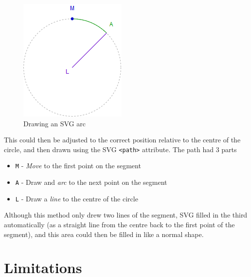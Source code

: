 \documentclass[ %
                    author={Aleena Baig},
                supervisor={Dr Simon Lock},
                    degree={BSc},
                     title={On Making Web Accessible Graphs},
                  subtitle={},
                      year={2019} ]{dissertation}
\begin{document}
\begin{figure}
\includegraphics[width=0.8\linewidth]{images/DrawingArc.png} 
\caption{Drawing an SVG arc}
\end{figure}

This could then be adjusted to the correct position relative to the centre of the circle, and then drawn using the SVG \texttt{<path>} attribute. The path had 3 parts

\begin{itemize}
    \item \texttt{M} - \textit{Move} to the first point on the segment
    \item \texttt{A} - Draw and \textit{arc} to the next point on the segment
    \item \texttt{L} - Draw a \textit{line} to the centre of the circle
\end{itemize}

Although this method only drew two lines of the segment, SVG filled in the third automatically (as a straight line from the centre back to the first point of the segment), and this area could then be filled in like a normal shape.


\section{Limitations}
\end{document}
